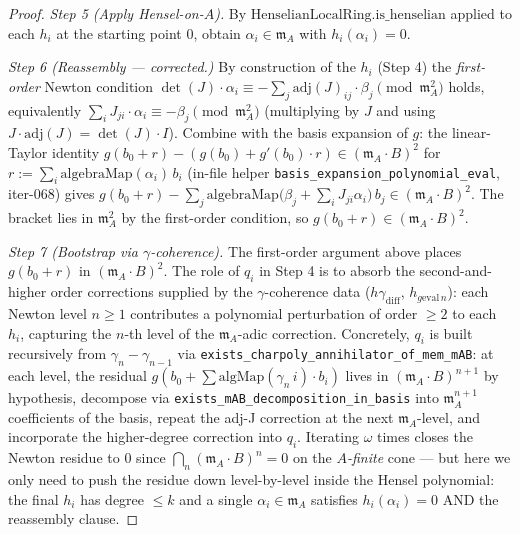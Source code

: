 \begin{proof}
\emph{Step 5 (Apply Hensel-on-$A$).}
By $\mathrm{HenselianLocalRing.is\_henselian}$ applied to each
$h_i$ at the starting point $0$, obtain
$\alpha_i \in \mathfrak m_A$ with $h_i(\alpha_i) = 0$.

\emph{Step 6 (Reassembly — corrected.)}
By construction of the $h_i$ (Step 4) the \emph{first-order}
Newton condition
$\det(J) \cdot \alpha_i \equiv -\sum_j \mathrm{adj}(J)_{ij}
\cdot \beta_j \pmod{\mathfrak m_A^2}$
holds, equivalently
$\sum_i J_{ji} \cdot \alpha_i \equiv -\beta_j \pmod{\mathfrak
m_A^2}$
(multiplying by $J$ and using $J \cdot \mathrm{adj}(J) =
\det(J) \cdot I$). Combine with the basis expansion of $g$:
the linear-Taylor identity
$g(b_0 + r) - (g(b_0) + g'(b_0) \cdot r) \in (\mathfrak m_A
\cdot B)^2$ for $r := \sum_i \mathrm{algebraMap}(\alpha_i)
\, b_i$ (in-file helper
\texttt{basis\_expansion\_polynomial\_eval}, iter-068) gives
$g(b_0 + r) - \sum_j \mathrm{algebraMap}\bigl(\beta_j + \sum_i
J_{ji} \alpha_i\bigr) \, b_j \in (\mathfrak m_A \cdot B)^2$.
The bracket lies in $\mathfrak m_A^2$ by the first-order
condition, so $g(b_0 + r) \in (\mathfrak m_A \cdot B)^2$.

\emph{Step 7 (Bootstrap via $\gamma$-coherence).}
The first-order argument above places $g(b_0 + r)$ in
$(\mathfrak m_A \cdot B)^2$. The role of $q_i$ in Step 4 is to
absorb the second-and-higher order corrections supplied by the
$\gamma$-coherence data ($h\gamma_{\mathrm{diff}}$,
$h_{g\mathrm{eval}\,n}$): each Newton level $n \geq 1$
contributes a polynomial perturbation of order $\geq 2$ to
each $h_i$, capturing the $n$-th level of the
$\mathfrak m_A$-adic correction. Concretely, $q_i$ is built
recursively from
$\gamma_n - \gamma_{n-1}$ via
\texttt{exists\_charpoly\_annihilator\_of\_mem\_mAB}: at each
level, the residual $g(b_0 + \sum \mathrm{algMap}(\gamma_n\,i)
\cdot b_i)$ lives in $(\mathfrak m_A \cdot B)^{n+1}$ by
hypothesis, decompose via
\texttt{exists\_mAB\_decomposition\_in\_basis} into
$\mathfrak m_A^{n+1}$ coefficients of the basis, repeat the
adj-J correction at the next $\mathfrak m_A$-level, and
incorporate the higher-degree correction into $q_i$. Iterating
$\omega$ times closes the Newton residue to $0$ since
$\bigcap_n (\mathfrak m_A \cdot B)^n = 0$ on the
\emph{$A$-finite} cone — but here we only need to push the
residue down level-by-level inside the Hensel polynomial: the
final $h_i$ has degree $\leq k$ and a single $\alpha_i \in
\mathfrak m_A$ satisfies $h_i(\alpha_i) = 0$ AND the reassembly
clause.


\end{proof}
